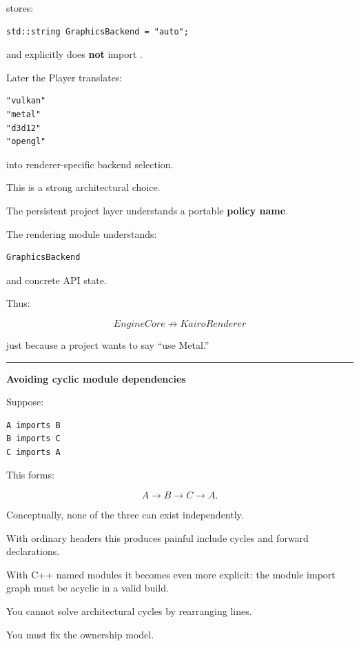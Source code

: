  stores:

\begin{verbatim}
std::string GraphicsBackend = "auto";
\end{verbatim}

and explicitly does \textbf{not} import .

Later the Player translates:

\begin{verbatim}
"vulkan"
"metal"
"d3d12"
"opengl"
\end{verbatim}

into renderer-specific backend selection.

This is a strong architectural choice.

The persistent project layer understands a portable \textbf{policy name}.

The rendering module understands:

\begin{verbatim}
GraphicsBackend
\end{verbatim}

and concrete API state.

Thus:

\[
EngineCore\nrightarrow KairoRenderer
\]

just because a project wants to say ``use Metal.''

\begin{center}\rule{0.5\linewidth}{0.5pt}\end{center}

\textbf{Avoiding cyclic module dependencies}

Suppose:

\begin{verbatim}
A imports B
B imports C
C imports A
\end{verbatim}

This forms:

\[
A\rightarrow B\rightarrow C\rightarrow A.
\]

Conceptually, none of the three can exist independently.

With ordinary headers this produces painful include cycles and forward declarations.

With C++ named modules it becomes even more explicit: the module import graph must be acyclic in a valid build.

You cannot solve architectural cycles by rearranging  lines.

You must fix the ownership model.

